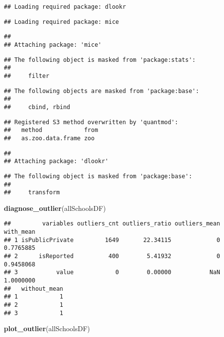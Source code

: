 \documentclass[]{article}
\newenvironment{Shaded}{\begin{snugshade}}{\end{snugshade}}
\newcommand{\KeywordTok}[1]{\textcolor[rgb]{0.13,0.29,0.53}{\textbf{#1}}}
\newcommand{\NormalTok}[1]{#1}
\begin{document}
\begin{verbatim}
## Loading required package: dlookr
\end{verbatim}

\begin{verbatim}
## Loading required package: mice
\end{verbatim}

\begin{verbatim}
## 
## Attaching package: 'mice'
\end{verbatim}

\begin{verbatim}
## The following object is masked from 'package:stats':
## 
##     filter
\end{verbatim}

\begin{verbatim}
## The following objects are masked from 'package:base':
## 
##     cbind, rbind
\end{verbatim}

\begin{verbatim}
## Registered S3 method overwritten by 'quantmod':
##   method            from
##   as.zoo.data.frame zoo
\end{verbatim}

\begin{verbatim}
## 
## Attaching package: 'dlookr'
\end{verbatim}

\begin{verbatim}
## The following object is masked from 'package:base':
## 
##     transform
\end{verbatim}

\begin{Shaded}
\begin{Highlighting}[]
\KeywordTok{diagnose_outlier}\NormalTok{(allSchoolsDF)}
\end{Highlighting}
\end{Shaded}

\begin{verbatim}
##         variables outliers_cnt outliers_ratio outliers_mean with_mean
## 1 isPublicPrivate         1649       22.34115             0 0.7765885
## 2      isReported          400        5.41932             0 0.9458068
## 3           value            0        0.00000           NaN 1.0000000
##   without_mean
## 1            1
## 2            1
## 3            1
\end{verbatim}

\begin{Shaded}
\begin{Highlighting}[]
\KeywordTok{plot_outlier}\NormalTok{(allSchoolsDF)}
\end{Highlighting}
\end{Shaded}
\end{document}
